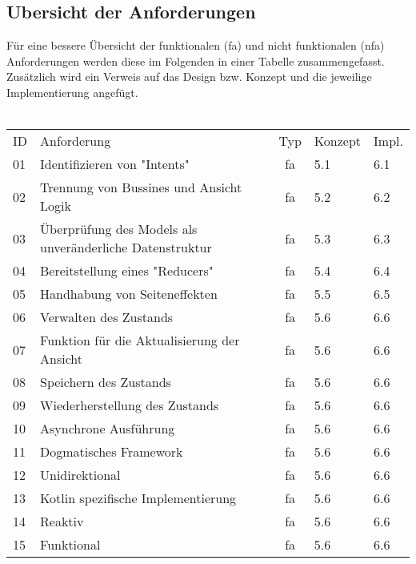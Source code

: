 \subsection{Ubersicht der Anforderungen}
Für eine bessere Übersicht der funktionalen (fa) und nicht funktionalen (nfa) Anforderungen werden diese im Folgenden in einer Tabelle zusammengefasst. Zusätzlich wird ein Verweis auf das Design bzw. Konzept und die jeweilige Implementierung angefügt.
\\
\\
\setlength{\tabcolsep}{0.5em} %
{\renewcommand{\arraystretch}{1.5}%
\begin{tabularx}{\textwidth}{ | l | l | c | l | l | }
	\hline	
	ID & Anforderung & Typ & Konzept & Impl.
	\\
	\specialrule{.1em}{.1em}{.1em}
	01 & Identifizieren von "Intents" & fa & 5.1 & 6.1
	\\
	\hline	
	02 & Trennung von Bussines und Ansicht Logik & fa & 5.2 & 6.2
	\\
	\hline
	03 & Überprüfung des Models als unveränderliche Datenstruktur & fa & 5.3 & 6.3
	\\
	\hline
	04 & Bereitstellung eines "Reducers" & fa & 5.4 & 6.4
	\\
	\hline
	05 & Handhabung von Seiteneffekten & fa & 5.5 & 6.5
	\\
	\hline
	06 & Verwalten des Zustands & fa & 5.6 & 6.6
	\\
	\hline
	07 & Funktion für die Aktualisierung der Ansicht & fa & 5.6 & 6.6
	\\
	\hline
	08 & Speichern des Zustands & fa & 5.6 & 6.6
	\\
	\hline
	09 & Wiederherstellung des Zustands & fa & 5.6 & 6.6
	\\
	\hline
	10 & Asynchrone Ausführung & fa & 5.6 & 6.6
	\\
	\hline
	11 & Dogmatisches Framework & fa & 5.6 & 6.6
	\\
	\hline
	12 & Unidirektional & fa & 5.6 & 6.6
	\\
	\hline
	13 & Kotlin spezifische Implementierung & fa & 5.6 & 6.6
	\\
	\hline
	14 & Reaktiv & fa & 5.6 & 6.6
	\\
	\hline
	15 & Funktional & fa & 5.6 & 6.6
	\\
	\hline
\end{tabularx}
}
